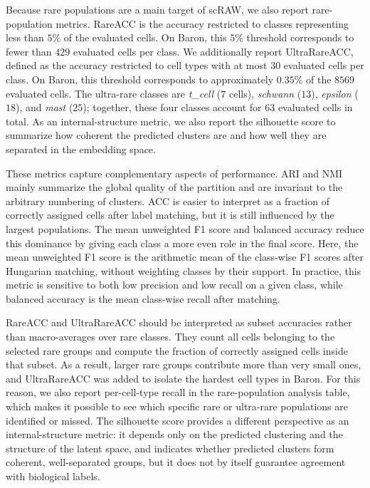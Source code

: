 \documentclass[11pt,a4paper]{article}
\begin{document}
Because rare populations are a main target of scRAW, we also report
rare-population metrics. RareACC is the accuracy restricted to classes
representing less than $5\%$ of the evaluated cells. On Baron, this
$5\%$ threshold corresponds to fewer than $429$ evaluated cells per
class. We additionally report UltraRareACC, defined as the accuracy
restricted to cell types with at most $30$ evaluated cells per class.
On Baron, this threshold corresponds to approximately $0.35\%$ of the
$8569$ evaluated cells. The ultra-rare classes are
\textit{t\_cell} ($7$ cells), \textit{schwann} ($13$),
\textit{epsilon} ($18$), and \textit{mast} ($25$); together, these
four classes account for $63$ evaluated cells in total. As an internal-structure
metric, we also report the silhouette score to summarize how coherent
the predicted clusters are and how well they are separated in the
embedding space.

These metrics capture complementary aspects of performance. ARI and NMI mainly summarize the global quality of the partition and are invariant to the arbitrary numbering of clusters. ACC is easier to interpret as a fraction of correctly assigned cells after label matching, but it is still influenced by the largest populations. The mean unweighted F1 score and balanced accuracy reduce this dominance by giving each class a more even role in the final score. Here, the mean unweighted F1 score is the arithmetic mean of the class-wise F1 scores after Hungarian matching, without weighting classes by their support. In practice, this metric is sensitive to both low precision and low recall on a given class, while balanced accuracy is the mean class-wise recall after matching.

RareACC and UltraRareACC should be interpreted as subset accuracies
rather than macro-averages over rare classes. They count all cells
belonging to the selected rare groups and compute the fraction of
correctly assigned cells inside that subset. As a result, larger rare
groups contribute more than very small ones, and UltraRareACC was added
to isolate the hardest cell types in Baron. For this reason, we also
report per-cell-type recall in the rare-population analysis table,
which makes it possible to see which specific rare or ultra-rare
populations are identified or missed. The silhouette score provides a
different perspective as an internal-structure metric: it depends only
on the predicted clustering and the structure of the latent space, and indicates whether
predicted clusters form coherent, well-separated groups, but it does not by itself
guarantee agreement with biological labels.
\end{document}
